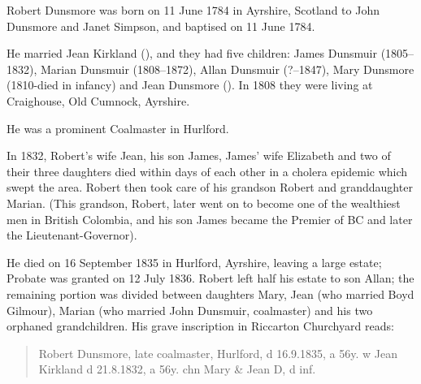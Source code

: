 
Robert Dunsmore was born on 11 June 1784 in Ayrshire, Scotland to John Dunsmore and Janet Simpson, and baptised on 11 June 1784.  

He married Jean Kirkland (), and they had five children: James Dunsmuir (1805--1832), Marian Dunsmuir (1808--1872), 
Allan Dunsmuir (?--1847), Mary Dunsmore (1810-died in infancy) and Jean Dunsmore (). In 1808 they were living at Craighouse, Old Cumnock, Ayrshire. \cite{RDunsmore1808}

He was a prominent Coalmaster in Hurlford. 

In 1832, Robert's wife Jean, his son James, James' wife Elizabeth and two of their three daughters died within days of each other in a cholera epidemic which swept the area. Robert then took care of his grandson Robert and granddaughter Marian. (This grandson, Robert, later went on to become one of the wealthiest men in British Colombia, and his son James became the Premier of BC and later the Lieutenant-Governor). 

He died on 16 September 1835 in Hurlford, Ayrshire, leaving a large estate; Probate was granted on 12 July 1836.\cite{RDunsmoreWill} Robert left half his estate to son Allan; the remaining portion was divided between daughters Mary, Jean (who married Boyd Gilmour), Marian (who married John Dunsmuir, coalmaster) and his two orphaned grandchildren.  His grave inscription in Riccarton Churchyard reads:

\begin{quotation}
Robert Dunsmore, late coalmaster, Hurlford, d 16.9.1835, a 56y. w Jean Kirkland d 21.8.1832, a 56y. chn Mary \& Jean D, d inf.
\end{quotation}

